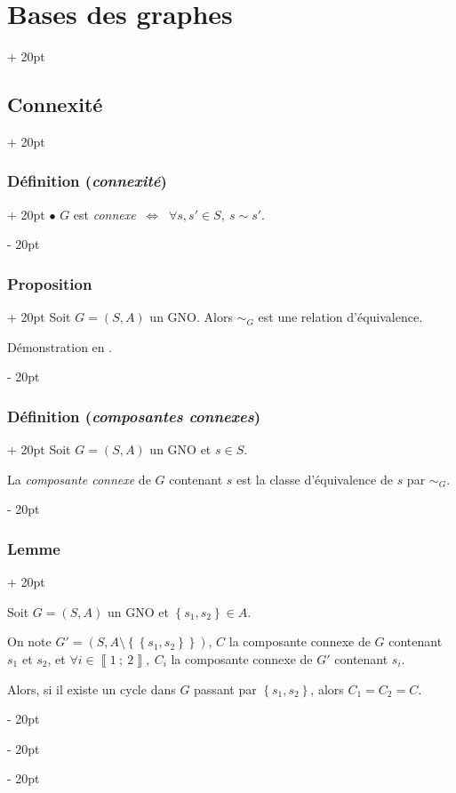 \documentclass[a4paper, 12pt, twoside]{article}
\newcommand{\nset}[2]{\left\llbracket #1\ ;\ #2 \right\rrbracket}
\newcommand{\set}[1]{\left\{ #1 \right\}}
\newcommand{\ssi}{\ \Leftrightarrow \ }
\newcommand{\ind}[1][20pt]{\advance\leftskip + #1}
\newcommand{\deind}[1][20pt]{\advance\leftskip - #1}
\newenvironment{indt}[2][20pt]{#2 \par \ind[#1]}{\par \deind} %
\begin{document}
\begin{indt}{\section{Bases des graphes}}
\begin{indt}{\subsection{Connexité}}
\begin{indt}{\subsubsection{Définition (\textit{connexité})}}
                $\bullet$ $G$ est \textit{connexe} $\ssi$ $\forall s, s' \in S,\ s \sim s'$.
            \end{indt}

            \vspace{12pt}
            
            \begin{indt}{\subsubsection{Proposition}}
                Soit $G = (S, A)$ un GNO. Alors $\sim_G$ est une relation d'équivalence.

                Démonstration en .
            \end{indt}

            \vspace{12pt}
            
            \begin{indt}{\subsubsection{Définition (\textit{composantes connexes})}}
                Soit $G = (S, A)$ un GNO et $s \in S$.

                La \textit{composante connexe} de $G$ contenant $s$ est la classe d'équivalence de $s$ par $\sim_G$.
            \end{indt}

            \vspace{12pt}
            
            \begin{indt}{\subsubsection{Lemme}}
                \label{2.2.11}

                Soit $G = (S, A)$ un GNO et $\set{s_1, s_2} \in A$.

                On note $G' = (S, A \setminus \set{\set{s_1, s_2}})$, $C$ la composante connexe de $G$ contenant $s_1$ et $s_2$, et $\forall i \in \nset 1 2,\ C_i$ la composante connexe de $G'$ contenant $s_i$.

                \vspace{12pt}
                
                Alors, si il existe un cycle dans $G$ passant par $\set{s_1, s_2}$, alors $C_1 = C_2 = C$.


\end{indt}
\end{indt}
\end{indt}
\end{document}
